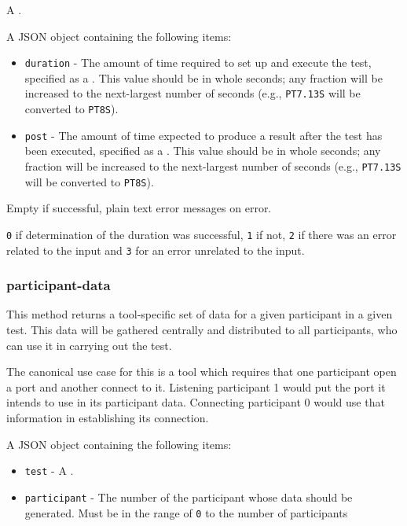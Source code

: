 \documentclass[10pt,titlepage]{article}
\begin{document}
 A .

 A JSON object containing the following
items:

\begin{itemize}
\item{\tt duration} - The amount of time required to set up and
  execute the test, specified as a .  This value
  should be in whole seconds; any fraction will be increased to the
  next-largest number of seconds (e.g., {\tt PT7.13S} will be
  converted to {\tt PT8S}).
\item{\tt post} - The amount of time expected to produce a result
  after the test has been executed, specified as a
  .  This value should be in whole seconds; any
  fraction will be increased to the next-largest number of seconds
  (e.g., {\tt PT7.13S} will be converted to {\tt PT8S}).  
\end{itemize}

 Empty if successful, plain text error
messages on error.

 {\tt 0} if determination of the duration was
successful, {\tt 1} if not, {\tt 2} if there was an error related to
the input and {\tt 3} for an error unrelated to the input.



\subsubsection{participant-data}

This method returns a tool-specific set of data for a given
participant in a given test.  This data will be gathered centrally and
distributed to all participants, who can use it in carrying out the test.

The canonical use case for this is a tool which requires that one
participant open a port and another connect to it.  Listening
participant 1 would put the port it intends to use in its participant
data.  Connecting participant 0 would use that information in
establishing its connection.


 A JSON object containing the following items:

\begin{itemize}
\item{\tt test} - A .

\item{\tt participant} - The number of the participant whose data
  should be generated.  Must be in the range of {\tt 0} to the number
  of participants
\end{itemize}
\end{document}

